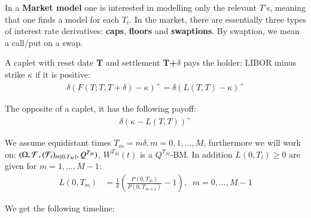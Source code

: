 \newpage 

In a \textbf{Market model} one is interested in modelling only the relevant $T$'s, meaning that one finds a model for each $T_{i}$. In the market, there are essentially three types of interest rate derivatives: \textbf{caps}, \textbf{floors} and 
\textbf{swaptions}. By swaption, we mean a call/put on a swap.

\begin{definition}
A caplet with reset date \textbf{T} and settlement \textbf{T+$\delta$} pays the holder: LIBOR minus strike $\kappa$ if it is positive: 
\begin{align*}
\delta(F(T;T,T+\delta) -\kappa)^{+} = \delta(L(T,T)-\kappa)^{+}
\end{align*}
\end{definition} 

\begin{definition}
The opposite of a caplet, it has the following payoff: 
\begin{align*}
\delta(\kappa - L(T,T))^{+}    
\end{align*}
\end{definition}

We assume equidistant times $T_{m} = m\delta, m = 0, 1, \dots, M$, furthermore we will work on: 
$(\Omega, \mathcal{F}, (\mathcal{F}_{t})_{t\in [0,T_{M}]}, Q^{T_{M}})$, $W^{T_{M}}(t)$ is a $Q^{T_{M}}$-BM. In addition $L(0,T_{i})\geq 0 $ are given for $m = 1, \dots, M-1$: 
\begin{align*}
L(0,T_{m}) &= \frac{1}{\delta}\left(
\frac{P(0,T_{m})}{P(0,T_{m+1})}-1
\right), \;\; m = 0, \dots, M-1   
\end{align*}

We get the following timeline:




